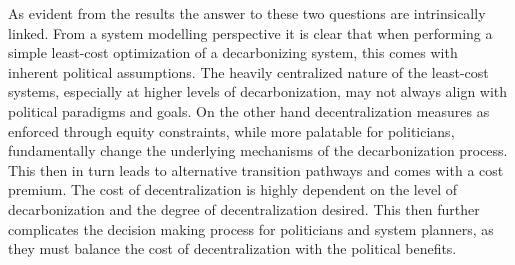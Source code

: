 \documentclass[preprint,12pt,nopreprintline]{elsarticle}
\begin{document}
\medskip
\noindent
As evident from the results the answer to these two questions are intrinsically linked. From a system modelling perspective it is clear that when performing a simple least-cost optimization of a decarbonizing system, this comes with inherent political assumptions. The heavily centralized nature of the least-cost systems, especially at higher levels of decarbonization, may not always align with political paradigms and goals. On the other hand decentralization measures as enforced through equity constraints, while more palatable for politicians, fundamentally change the underlying mechanisms of the decarbonization process. This then in turn leads to alternative transition pathways and comes with a cost premium. The cost of decentralization is highly dependent on the level of decarbonization and the degree of decentralization desired. This then further complicates the decision making process for politicians and system planners, as they must balance the cost of decentralization with the political benefits.
\end{document}

